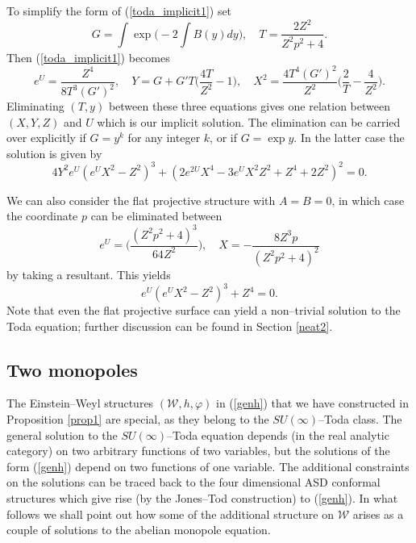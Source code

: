 To simplify the form of (\ref{toda_implicit1}) set
\[
G=\int\exp{\Big(-2\int B(y)dy\Big)}, \quad T=\frac{2Z^2}{Z^2p^2+4}.
\]
Then (\ref{toda_implicit1}) becomes
\[
e^U=\frac{Z^4}{8T^3 (G')^2}, \quad Y=G+G'T\Big(\frac{4T}{Z^2}-1\Big), \quad
X^2=\frac{4T^4(G')^2}{Z^2}\Big(\frac{2}{T}-\frac{4}{Z^2} \Big).
\]
Eliminating $(T, y)$ between these three equations gives one relation between $(X, Y, Z)$ and  $U$ which is our implicit solution.
The elimination can be carried over explicitly if $G=y^k$ for any integer $k$, or if $G=\exp{y}$. In the latter case the solution is given by
\[
4Y^2e^U(e^UX^2-Z^2)^3+(2e^{2U}X^4-3e^UX^2Z^2+Z^4+2Z^2)^2=0.
\]

We can also consider the flat projective structure with $A=B=0$, in which case
the coordinate $p$ can be eliminated between
\[
e^U=\bigg(\frac{(Z^2p^2+4)^3}{64Z^2}\bigg), \quad
X=-\frac{8Z^3p}{(Z^2p^2+4)^2}
\]
by taking a resultant. This yields
\[
e^U(e^UX^2-Z^2)^3+Z^4=0.
\]
Note that even the flat projective surface can yield a non--trivial solution to the Toda equation; further discussion can be found in Section \ref{neat2}.


\subsection{Two monopoles} \label{sec:monopoles}
The Einstein--Weyl structures $(\mathcal{W},h,\varphi)$ in (\ref{genh}) that we have constructed in Proposition \ref{prop1}
are special, as they belong to the $SU(\infty)$--Toda class. %
The general solution to the $SU(\infty)$--Toda equation depends (in the real analytic category) on 
two arbitrary functions of two variables, but the solutions of the form (\ref{genh}) depend on two functions of one variable. The additional constraints on the solutions can be traced back to the four dimensional ASD conformal structures
which give rise (by the Jones--Tod construction) to (\ref{genh}).
In what follows we shall point out how some of the additional structure on $\mathcal{W}$ arises as a couple of solutions to the abelian monopole equation.

